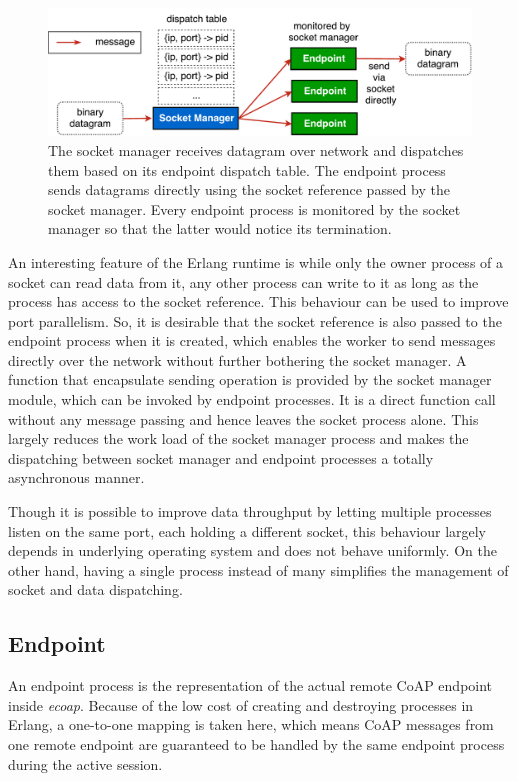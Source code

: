 \begin{figure}[!htbp]
\centering
\includegraphics[scale = 0.55]{coap_socket_manager}
\caption{The socket manager receives datagram over network and dispatches them based on its endpoint dispatch table. The endpoint process sends datagrams directly using the socket reference passed by the socket manager. Every endpoint process is monitored by the socket manager so that the latter would notice its termination.}
\label{fig:coap_socket_manager}
\end{figure}

An interesting feature of the Erlang runtime is while only the owner process of a socket can read data from it, any other process can write to it as long as the process has access to the socket reference. This behaviour can be used to improve port parallelism. So, it is desirable that the socket reference is also passed to the endpoint process when it is created, which enables the worker to send messages directly over the network without further bothering the socket manager. A function that encapsulate sending operation is provided by the socket manager module, which can be invoked by endpoint processes. It is a direct function call without any message passing and hence leaves the socket process alone. This largely reduces the work load of the socket manager process and makes the dispatching between socket manager and endpoint processes a totally asynchronous manner.

Though it is possible to improve data throughput by letting multiple processes listen on the same port, each holding a different socket, this behaviour largely depends in underlying operating system and does not behave uniformly. On the other hand, having a single process instead of many simplifies the management of socket and data dispatching.

\subsection{Endpoint}\label{coap_endpoint}

An endpoint process is the representation of the actual remote CoAP endpoint inside \textit{ecoap}. Because of the low cost of creating and destroying processes in Erlang, a one-to-one mapping is taken here, which means CoAP messages from one remote endpoint are guaranteed to be handled by the same endpoint process during the active session.

